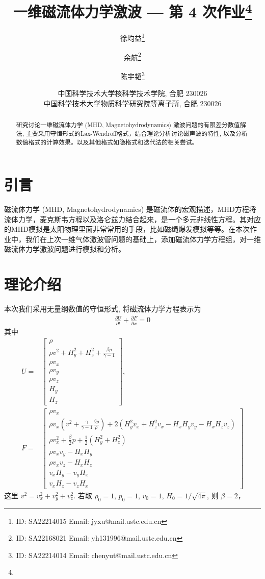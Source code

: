 \documentclass[10.5pt
]{article}
\title{一维磁流体力学激波 --- 第 4 次作业\footnote{\Term\Course}}
\author{徐均益\footnote{ID: SA22214015 Email: jyxu@mail.ustc.edu.cn}
  \and
  余航\footnote{ID: SA22168021 Email: yh131996@mail.ustc.edu.cn}
  \and
  陈宇韬\footnote{ID: SA22214014 Email: chenyut@mail.ustc.edu.cn}
}
\date{%
\scriptsize%
中国科学技术大学核科学技术学院, 合肥 230026 \\
中国科学技术大学物质科学研究院等离子所, 合肥 230026
%
}
\begin{document}
\maketitle

\begin{abstract}
研究讨论一维磁流体力学 (MHD, Magnetohydrodynamics) 激波问题的有限差分数值解法, 主要采用守恒形式的Lax-Wendroff格式，结合理论分析讨论磁声波的特性,
以及分析数值格式的计算效果。以及其他格式如隐格式和迭代法的相关尝试。
\end{abstract}

\section{引言}
磁流体力学 (MHD, Magnetohydrodynamics) 是磁流体的宏观描述，MHD方程将流体力学，麦克斯韦方程以及洛仑兹力结合起来，是一个多元非线性方程。其对应的MHD模拟是太阳物理里面非常常用的手段，比如磁绳爆发模拟等等。在本次作业中，我们在上次一维气体激波管问题的基础上，添加磁流体力学方程组，对一维磁流体力学激波问题进行模拟和分析。

\section{理论介绍}\label{DLess}
本次我们采用无量纲数值的守恒形式, 将磁流体力学方程表示为
\begin{align}
\frac{\partial U}{\partial t} + \frac{\partial F}{\partial x} = 0 \label{Eqn:MHD}
\end{align}
其中
\begin{align}
U = & \left[ \begin{array}{l}
\rho\\
\rho v^2 + H_y^2 + H_z^2 + \frac{\beta p}{\gamma -1}
\\
\rho v_x\\
\rho v_y\\
\rho v_z\\
H_y\\
H_z
\end{array} \right]\label{Eqn:Flux_U}, \\
F = & \left[ \begin{array}{l}
\rho v_x\\
\rho v_x \left(v^2 + \frac{\gamma}{\gamma - 1} \frac{\beta p}{\rho} \right) + 2(H_y^2 v_x + H_z^2 v_x - H_x H_y v_y - H_x H_z v_z)
\\
\rho v_x^2 + \frac{\beta}{2} p + \frac{1}{2} (H_y^2 + H_z^2)\\
\rho v_x v_y - H_x H_y\\
\rho v_x v_z - H_x H_z\\
v_x H_y - v_y H_x\\
v_x H_z - v_z H_x
\end{array} \right] \label{Eqn:Flux}
\end{align}
这里 $v^2 = v_x^2 + v_y^2 + v_z^2$. 若取 $\rho_0 = 1$, $p_0 = 1$, $v_0 = 1$, $H_0 = 1/\sqrt{4\pi}$, 则 $\beta = 2$，
\end{document}
